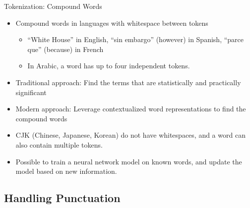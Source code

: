 \documentclass{beamer}
\renewcommand{\cite}{\citep}
\begin{document}
\begin{frame}{Tokenization: Compound Words}
\begin{itemize}
\item Compound words in languages with whitespace between tokens
	\begin{itemize}
	\item ``White House'' in English, ``sin embargo'' (however) in Spanish, ``parce que'' (because) in French~\cite{barrett2011building}
	\item In Arabic, a word has up to four independent tokens.~\cite{attia2007arabic}
	\end{itemize}
	\bigskip
\item Traditional approach: Find the terms that are statistically and practically significant~\cite{blei2009visualizing}
\item Modern approach: Leverage contextualized word representations to find the compound words~\cite{shwartz2019still}
	\bigskip
\item CJK (Chinese, Japanese, Korean) do not have whitespaces, and a word can also contain multiple tokens.
\item Possible to train a neural network model on known words, and update the model based on new information.~\cite{hiraoka2019stochastic}
\end{itemize}
\end{frame}


\subsection{Handling Punctuation}
\end{document}
